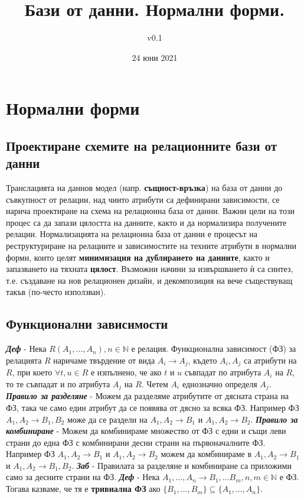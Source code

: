 \documentclass[fleqn,12pt]{article}
\title{Бази от данни. Нормални форми.}
\author{v0.1}
\date{24 юни 2021}
\begin{document}
\maketitle
\tableofcontents
\pagebreak


\section{Нормални форми}
\subsection{Проектиране схемите на релационните бази от данни}

Транслацията на даннов модел (напр. \textbf{същност-връзка}) на база от данни до съвкупност от релации, над чиито атрибути са дефинирани зависимости, се нарича проектиране на схема на релационна база от данни.
Важни цели на този процес са да запази цялостта на данните, както и да нормализира получените релации.
\bigbreak
Нормализацията на релационна база от данни е процесът на реструктуриране на релациите и зависимостите на техните атрибути в нормални форми, които целят \textbf{минимизация на дублирането на данните}, както и запазването на тяхната \textbf{цялост}.
Възможни начини за извършването ѝ са синтез, т.е. създаване на нов релационен дизайн, и декомпозиция на вече съществуващ такъв (по-често използван).

\subsection{Функционални зависимости}

\textbf{\textit{Деф}} - Нека $R(A_1, \dots, A_n), n \in \mathbb{N}$ е релация.
Функционална зависимост (ФЗ) за релацията $R$ наричаме твърдение от вида $A_i \rightarrow A_j$, където $A_i, A_j$ са атрибути на $R$, при което $\forall t, u \in R$ е изпълнено, че ако $t$ и $u$ съвпадат по атрибута $A_i$ на $R$, то те съвпадат и по атрибута $A_j$ на $R$.
Четем $A_i$ еднозначно определя $A_j$.
\bigbreak
\textbf{\textit{Правило за разделяне}} - Можем да разделяме атрибутите от дясната страна на ФЗ, така че само един атрибут да се появява от дясно за всяка ФЗ.
Например ФЗ $A_1, A_2 \rightarrow B_1, B_2$ може да се раздели на $A_1, A_2 \rightarrow B_1$ и $A_1, A_2 \rightarrow B_2$.
\bigbreak
\textbf{\textit{Правило за комбиниране}} - Можем да комбинираме множество от ФЗ с едни и същи леви страни до една ФЗ с комбинирани десни страни на първоначалните ФЗ.
Например ФЗ $A_1, A_2 \rightarrow B_1$ и $A_1, A_2 \rightarrow B_2$ можем да комбинираме в $A_1, A_2 \rightarrow B_1$ и $A_1, A_2 \rightarrow B_1, B_2$.
\bigbreak
\textbf{\textit{Заб}} - Правилата за разделяне и комбиниране са приложими само за десните страни на ФЗ.
\bigbreak
\textbf{\textit{Деф}} - Нека $A_1, \dots, A_n \rightarrow B_1, \dots B_m, n, m \in \mathbb{N}$ е ФЗ.
Тогава казваме, че тя е \textbf{тривиална ФЗ} ако $\{B_1, \dots, B_m\} \subseteq \{A_1, \dots, A_n\}$.
\end{document}
